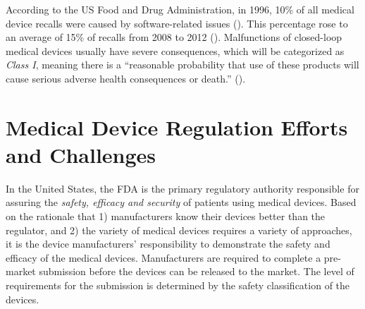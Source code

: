 According to the US Food and Drug Administration, in 1996, 10\% of all medical device recalls were caused by software-related issues (\cite{medstats}). 
This percentage rose to an average of 15\% of recalls from 2008 to 2012 (). 
Malfunctions of closed-loop medical devices usually have severe consequences, which will be categorized as \emph{Class I}, meaning there is a ``reasonable probability that use of these products will cause serious adverse health consequences or death.'' (\cite{medstats2,pacemakerrecalls,killedbycode}). 



\section{Medical Device Regulation Efforts and Challenges}
In the United States, the FDA is the primary regulatory authority responsible for assuring the \emph{safety, efficacy and security }of patients using medical devices. 
Based on the rationale that 1) manufacturers know their devices better than the regulator, and 2) the variety of medical devices requires a variety of approaches, it is the device manufacturers' responsibility to demonstrate the safety and efficacy of the medical devices. 
Manufacturers are required to complete a pre-market submission before the devices can be released to the market. 
The level of requirements for the submission is determined by the safety classification of the devices.

